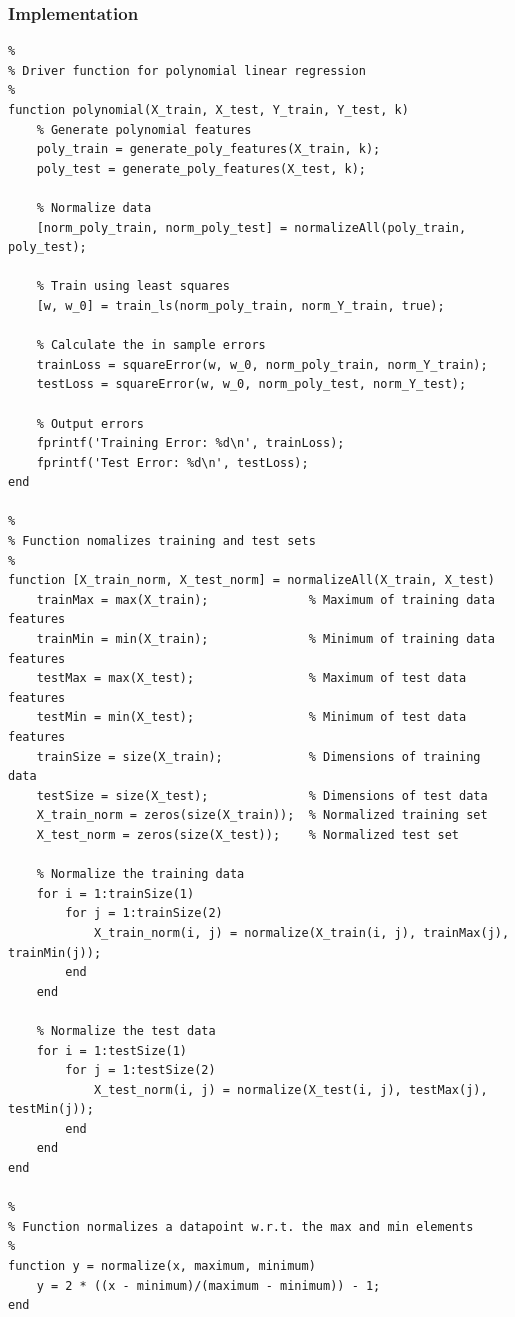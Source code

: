 \documentclass[11pt, oneside]{article}   	%
\begin{document}
\subsubsection{Implementation}
\begin{verbatim}
%
% Driver function for polynomial linear regression
%
function polynomial(X_train, X_test, Y_train, Y_test, k)
    % Generate polynomial features
    poly_train = generate_poly_features(X_train, k);
    poly_test = generate_poly_features(X_test, k);
    
    % Normalize data
    [norm_poly_train, norm_poly_test] = normalizeAll(poly_train, poly_test);
    
    % Train using least squares
    [w, w_0] = train_ls(norm_poly_train, norm_Y_train, true);
    
    % Calculate the in sample errors
    trainLoss = squareError(w, w_0, norm_poly_train, norm_Y_train);
    testLoss = squareError(w, w_0, norm_poly_test, norm_Y_test);
    
    % Output errors
    fprintf('Training Error: %d\n', trainLoss);
    fprintf('Test Error: %d\n', testLoss);
end

%
% Function nomalizes training and test sets
%
function [X_train_norm, X_test_norm] = normalizeAll(X_train, X_test)
    trainMax = max(X_train);              % Maximum of training data features
    trainMin = min(X_train);              % Minimum of training data features
    testMax = max(X_test);                % Maximum of test data features
    testMin = min(X_test);                % Minimum of test data features
    trainSize = size(X_train);            % Dimensions of training data
    testSize = size(X_test);              % Dimensions of test data
    X_train_norm = zeros(size(X_train));  % Normalized training set
    X_test_norm = zeros(size(X_test));    % Normalized test set
    
    % Normalize the training data
    for i = 1:trainSize(1)
        for j = 1:trainSize(2)
            X_train_norm(i, j) = normalize(X_train(i, j), trainMax(j), trainMin(j));
        end
    end
    
    % Normalize the test data
    for i = 1:testSize(1)
        for j = 1:testSize(2)
            X_test_norm(i, j) = normalize(X_test(i, j), testMax(j), testMin(j));
        end
    end
end

%
% Function normalizes a datapoint w.r.t. the max and min elements
%
function y = normalize(x, maximum, minimum)
    y = 2 * ((x - minimum)/(maximum - minimum)) - 1;
end


\end{verbatim}
\end{document}
